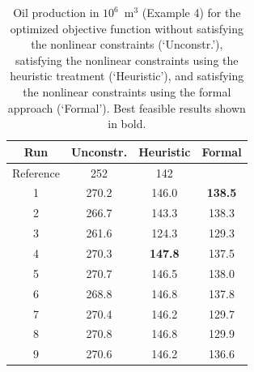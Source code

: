 \documentclass[twocolumn,numbook]{svjour3}          %
\begin{document}
\begin{table}
\centering
\caption{Oil production in $10^6$~m$^3$ (Example 4) for the optimized objective function
         without satisfying the nonlinear constraints (`Unconstr.'), satisfying the nonlinear constraints
         using the heuristic treatment (`Heuristic'), and satisfying the nonlinear constraints
         using the formal approach (`Formal'). Best feasible results shown in bold.}
\begin{tabular}{|c|c|c|c|}
\hline
Run               & Unconstr. & Heuristic & Formal  \\
\hline
Reference         & 252         & 142          &             \\
1  & 270.2            & 146.0          & \bf{138.5}        \\
2  & 266.7            & 143.3          & 138.3    \\
3  & 261.6            & 124.3          & 129.3          \\
4  & 270.3            & \bf{147.8}   & 137.5         \\
5  & 270.7            & 146.5          & 138.0    \\
6  & 268.8            & 146.8          & 137.8 \\
7  & 270.4            & 146.2          & 129.7         \\
8  & 270.8            & 146.8          & 129.9      \\
9  & 270.6            & 146.2          & 136.6       \\
\hline
\end{tabular}
  \label{table:Norne}
\end{table}

\end{document}
